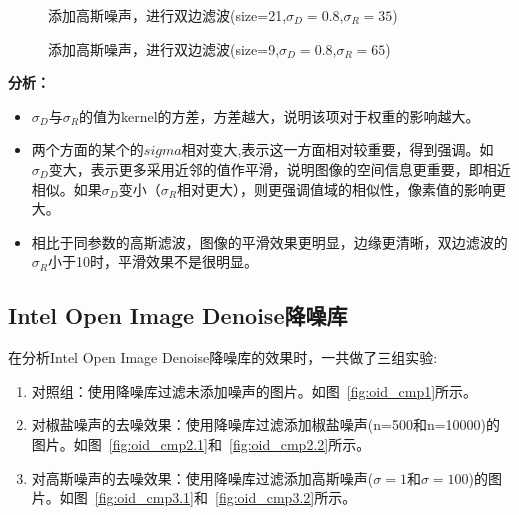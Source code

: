 \documentclass[lang=cn,10pt]{elegantbook}
\begin{document}
\begin{figure}[htbp]
	\centering
	\caption{添加高斯噪声，进行双边滤波(size=21,$\sigma_D=0.8$,$\sigma_R=35$)}
	\label{fig:bi_cmp3.2}
\end{figure}

\begin{figure}[htbp]
	\centering
	\caption{添加高斯噪声，进行双边滤波(size=9,$\sigma_D=0.8$,$\sigma_R=65$)}
	\label{fig:bi_cmp4}
\end{figure}

\vspace{5pt}
\quad \textcolor{second}{\textbf{分析：}}
\begin{itemize}
\item $\sigma_D$与$\sigma_R$的值为kernel的方差，方差越大，说明该项对于权重的影响越大。

\item 两个方面的某个的$sigma$相对变大,表示这一方面相对较重要，得到强调。如 $\sigma_D$变大，表示更多采用近邻的值作平滑，说明图像的空间信息更重要，即相近相似。如果$\sigma_D$变小（$\sigma_R$相对更大），则更强调值域的相似性，像素值的影响更大。

\item 相比于同参数的高斯滤波，图像的平滑效果更明显，边缘更清晰，双边滤波的$\sigma_R$小于10时，平滑效果不是很明显。

\end{itemize}


\subsection{Intel Open Image Denoise降噪库}
在分析Intel Open Image Denoise降噪库的效果时，一共做了三组实验:
\vspace{5pt}
\begin{enumerate}[itemsep=1.5ex]

\item 对照组：使用降噪库过滤未添加噪声的图片。如图~\ref{fig:oid_cmp1}所示。

\item 对椒盐噪声的去噪效果：使用降噪库过滤添加椒盐噪声(n=500和n=10000)的图片。如图~\ref{fig:oid_cmp2.1}和~\ref{fig:oid_cmp2.2}所示。

\item 对高斯噪声的去噪效果：使用降噪库过滤添加高斯噪声($\sigma=1$和$\sigma=100$)的图片。如图~\ref{fig:oid_cmp3.1}和~\ref{fig:oid_cmp3.2}所示。

\end{enumerate}
\end{document}
